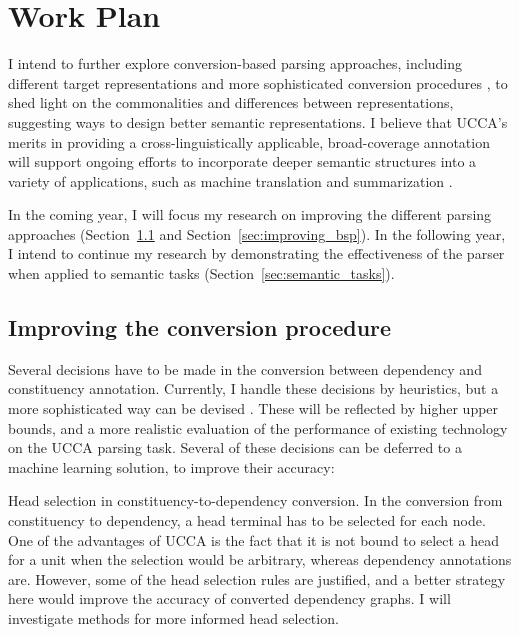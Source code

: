 \documentclass[12pt]{article}
\makeatletter
\newcommand{\secref}[1]{Section~\ref{#1}}
\renewcommand{\paragraph}{
  \@startsection{paragraph}{4}
  {\z@}{.3ex \@plus .3ex \@minus .2ex}{-1em}
  {\normalfont\normalsize\bfseries}
}
\makeatother
\begin{document}
\section{Work Plan}\label{sec:plan}

I intend to further explore conversion-based parsing approaches,
including different target representations and more sophisticated conversion
procedures \cite{kong-15},
to shed light on the commonalities and differences between representations,
suggesting ways to design better semantic representations.
I believe that UCCA's merits in providing a cross-linguistically applicable,
broad-coverage annotation will support ongoing efforts to incorporate deeper
semantic structures into a variety of applications, such as machine translation
\cite{jones2012semantics} and summarization \cite{liu2015toward}.

In the coming year, I will focus my research on improving the different parsing approaches
(\secref{sec:improving_conversions} and \secref{sec:improving_bsp}).
In the following year, I intend to continue my research by demonstrating the effectiveness
of the parser when applied to semantic tasks (\secref{sec:semantic_tasks}).


\subsection{Improving the conversion procedure}\label{sec:improving_conversions}
Several decisions have to be made in the conversion between dependency and
constituency annotation.
Currently, I handle these decisions by heuristics, but a more
sophisticated way can be devised \cite{fernandez2015parsing}.
These will be reflected by higher upper bounds, and a more realistic evaluation
of the performance of existing technology on the UCCA parsing task.
Several of these decisions can be deferred to a machine learning solution,
to improve their accuracy:

\paragraph{Head selection in constituency-to-dependency conversion.}
In the conversion from constituency to dependency, a head terminal has to be
selected for each node. One of the advantages of UCCA is the fact that it is not bound
to select a head for a unit when the selection would be arbitrary, whereas dependency
annotations are. However, some of the head selection rules are justified, and a
better strategy here would improve the accuracy of converted dependency graphs.
I will investigate methods for more informed head selection.
\end{document}
